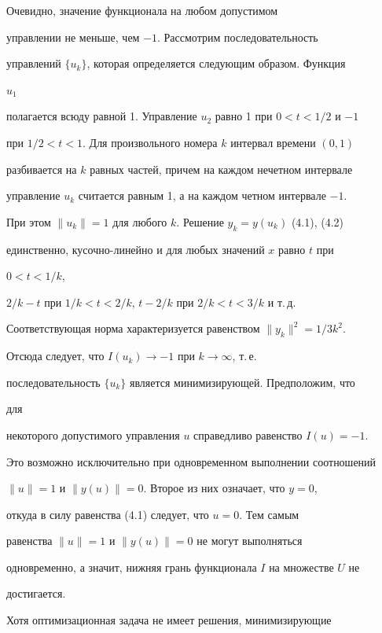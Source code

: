  


\begin{pf} 


Очевидно, значение функционала на любом допустимом 


управлении не меньше, чем $-1$. Рассмотрим последовательность 


управлений $\{u_k\}$, которая определяется следующим образом. Функция 


$u_1$ 


полагается всюду равной 1. Управление $u_2$ равно 1 при $0<t<1/2$ и $-1$ 


при $1/2<t<1$. Для произвольного номера $k$ интервал времени $(0,1)$ 


разбивается на $k$ равных частей, причем на каждом нечетном интервале 


управление $u_k$ считается равным 1, а на каждом четном интервале $-1$. 


При этом $\|u_k\|=1$ для любого $k$. Решение $y_k=y(u_k)$ (4.1), (4.2) 


единственно, кусочно-линейно и для любых значений $x$ равно $t$ при 


$0<t<1/k$, 


$2/k-t$ при $1/k<t<2/k$, $t-2/k$ при $2/k<t<3/k$ и т.\,д. 


Соответствующая норма характеризуется равенством $\|y_k\|^2=1/3k^2$. 


Отсюда следует, что $I(u_k)\to-1$ при $k\to\infty$, т.\,е. 


последовательность $\{u_k\}$ является минимизирующей. Предположим, что 


для 


некоторого допустимого управления $u$ справедливо равенство $I(u)=-1$. 


Это возможно исключительно при одновременном выполнении соотношений 


$\|u\|=1$ и $\|y(u)\|=0$. Второе из них означает, что $y=0$, 


откуда в силу равенства (4.1) следует, что $u=0$. Тем самым 


равенства $\|u\|=1$ и $\|y(u)\|=0$ не могут выполняться 


одновременно, а значит, нижняя грань функционала $I$ на множестве $U$ не 


достигается. 


\end{pf} 


 


Хотя оптимизационная задача не имеет решения, минимизирующие 


